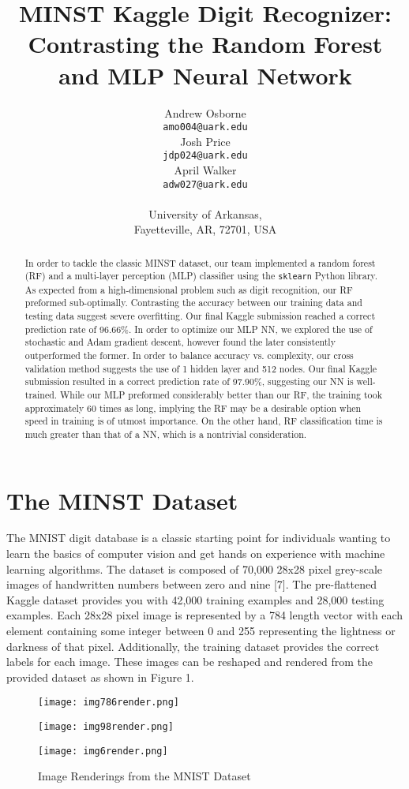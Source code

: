 \documentclass{article}
\title{MINST Kaggle Digit Recognizer: Contrasting the Random Forest and MLP Neural Network}
\author{%
   Andrew Osborne \\
   \texttt{amo004@uark.edu} \\
   \And
   Josh Price \\
   \texttt{jdp024@uark.edu} \\
   \AND
   April Walker \\
   \texttt{adw027@uark.edu} \\
   \\
   University of Arkansas, \\
   Fayetteville, AR, 72701, USA
}
\begin{document}

\maketitle

\begin{abstract}
  In order to tackle the classic MINST dataset, our team implemented a random forest (RF) and a multi-layer perception (MLP) classifier using the \verb+sklearn+ Python library. As expected from a high-dimensional problem such as digit recognition, our RF preformed sub-optimally. Contrasting the accuracy between our training data and testing data suggest severe overfitting. Our final Kaggle submission reached a correct prediction rate of 96.66\%. In order to optimize our MLP NN, we explored the use of stochastic and Adam gradient descent, however found the later consistently outperformed the former. In order to balance accuracy vs. complexity, our cross validation method suggests the use of 1 hidden layer and 512 nodes. Our final Kaggle submission resulted in a correct prediction rate of 97.90\%, suggesting our NN is well-trained. While our MLP preformed considerably better than our RF, the training took approximately 60 times as long, implying the RF may be a desirable option when speed in training is of utmost importance. On the other hand, RF classification time is much greater than that of a NN, which is a nontrivial consideration.
\end{abstract}

\section{The MINST Dataset}
The MNIST digit database is a classic starting point for individuals wanting to learn the basics of computer vision and get hands on experience with machine learning algorithms. The dataset is composed of 70,000 28x28 pixel grey-scale images of handwritten numbers between zero and nine [7]. The pre-flattened Kaggle dataset provides you with 42,000 training examples and 28,000 testing examples. Each 28x28 pixel image is represented by a 784 length vector with each element containing some integer between 0 and 255 representing the lightness or darkness of that pixel. Additionally, the training dataset provides the correct labels for each image. These images can be reshaped and rendered from the provided dataset as shown in Figure 1.
\begin{figure}[h]
  \centering
    \begin{minipage}[t]{0.3\textwidth}
        \texttt{[image: img786render.png]}
    \end{minipage}
    \begin{minipage}[t]{0.3\textwidth}
        \texttt{[image: img98render.png]}
    \end{minipage}
    \begin{minipage}[t]{0.3\textwidth}
        \texttt{[image: img6render.png]}
    \end{minipage}
  \caption{Image Renderings from the MNIST Dataset}
\end{figure}
\end{document}

